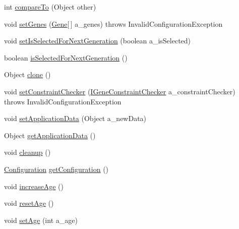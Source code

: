 \begin{DoxyCompactItemize}
int \hyperlink{classorg_1_1jgap_1_1_genotype_test_1_1_my_chromosome_af684e72b8fd995f4f39f0009c809c3a4}{compare\-To} (Object other)
\item 
void \hyperlink{classorg_1_1jgap_1_1_genotype_test_1_1_my_chromosome_ae183a5fc7e0f40ac707ae3bc69a7fd6f}{set\-Genes} (\hyperlink{interfaceorg_1_1jgap_1_1_gene}{Gene}\mbox{[}$\,$\mbox{]} a\-\_\-genes)  throws Invalid\-Configuration\-Exception 
\item 
void \hyperlink{classorg_1_1jgap_1_1_genotype_test_1_1_my_chromosome_a542e571ec89ab56722d0396d038a3c03}{set\-Is\-Selected\-For\-Next\-Generation} (boolean a\-\_\-is\-Selected)
\item 
boolean \hyperlink{classorg_1_1jgap_1_1_genotype_test_1_1_my_chromosome_a3c465ea8dfe5e6b7d5a1f3dfeb2e38cd}{is\-Selected\-For\-Next\-Generation} ()
\item 
Object \hyperlink{classorg_1_1jgap_1_1_genotype_test_1_1_my_chromosome_ace23248a8547679cfd6b352a8dbe6e15}{clone} ()
\item 
void \hyperlink{classorg_1_1jgap_1_1_genotype_test_1_1_my_chromosome_aee091968753a941ce51377ace0c0d916}{set\-Constraint\-Checker} (\hyperlink{interfaceorg_1_1jgap_1_1_i_gene_constraint_checker}{I\-Gene\-Constraint\-Checker} a\-\_\-constraint\-Checker)  throws Invalid\-Configuration\-Exception 
\item 
void \hyperlink{classorg_1_1jgap_1_1_genotype_test_1_1_my_chromosome_a20c792fe3836ca8d6e69e6c183217f41}{set\-Application\-Data} (Object a\-\_\-new\-Data)
\item 
Object \hyperlink{classorg_1_1jgap_1_1_genotype_test_1_1_my_chromosome_a472baec7498af812e73a463d7c6870c8}{get\-Application\-Data} ()
\item 
void \hyperlink{classorg_1_1jgap_1_1_genotype_test_1_1_my_chromosome_ab38c7c63e7a8468145a13a507939ceb7}{cleanup} ()
\item 
\hyperlink{classorg_1_1jgap_1_1_configuration}{Configuration} \hyperlink{classorg_1_1jgap_1_1_genotype_test_1_1_my_chromosome_ac46d8ea344d04de7b648dd6d03ae94b3}{get\-Configuration} ()
\item 
void \hyperlink{classorg_1_1jgap_1_1_genotype_test_1_1_my_chromosome_a14d03b6c15e6414112ddb39e4a4ec41b}{increase\-Age} ()
\item 
void \hyperlink{classorg_1_1jgap_1_1_genotype_test_1_1_my_chromosome_a1ae5b0090b2241c90518cbd386753db8}{reset\-Age} ()
\item 
void \hyperlink{classorg_1_1jgap_1_1_genotype_test_1_1_my_chromosome_a7a2a95044a2d93b6c1529641dcdbaab9}{set\-Age} (int a\-\_\-age)

\end{DoxyCompactItemize}
